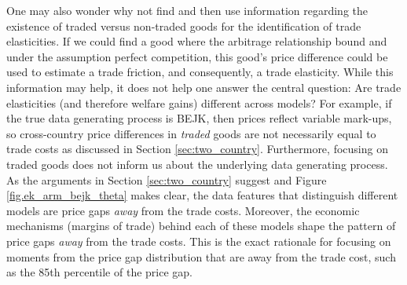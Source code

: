 \documentclass[12pt,dvips, ps2pdf]{article}
\begin{document}
One may also wonder why not find and then use information regarding the existence of traded versus non-traded goods for the identification of trade elasticities. If we could find a good where the arbitrage relationship bound and under the assumption perfect competition, this good's price difference could be used to estimate a trade friction, and consequently, a trade elasticity. While this information may help, it does not help one answer the central question: Are trade elasticities (and therefore welfare gains) different across models? For example, if the true data generating process is BEJK, then prices reflect variable mark-ups, so cross-country price differences in \emph{traded} goods are not necessarily equal to trade costs as discussed in Section \ref{sec:two_country}. Furthermore, focusing on traded goods does not inform us about the underlying data generating process. As the arguments in Section \ref{sec:two_country} suggest and Figure \ref{fig.ek_arm_bejk_theta} makes clear, the data features that distinguish different models are price gaps \emph{away} from the trade costs. Moreover, the economic mechanisms (margins of trade) behind each of these models shape the pattern of price gaps \emph{away} from the trade costs. This is the exact rationale for focusing on moments from the price gap distribution that are away from the trade cost, such as the 85th percentile of the price gap.


%
\end{document}
